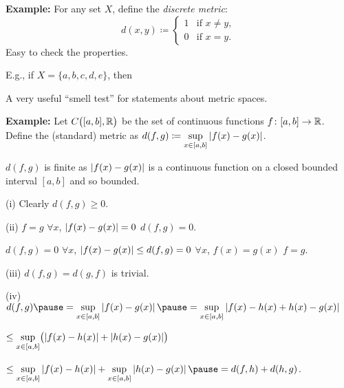 \documentclass[10pt,aspectratio=169]{beamer}
\begin{document}
\begin{frame}

\textbf{Example:}
For any set $X$, define the \emph{discrete metric}:
\begin{equation*}
d(x,y) \coloneqq
\begin{cases}
1 & \text{if } x \not= y, \\
0 & \text{if } x = y.
\end{cases}
\end{equation*}
\pause
Easy to check the properties.

\pause
\medskip

E.g., if $X = \{ a,b,c,d,e \}$, then

\begin{center}
\end{center}

\pause
A very useful 
``smell test'' for statements about metric spaces.
\end{frame}

\begin{frame}

\textbf{Example:}
Let $C\bigl([a,b],{\mathbb{R}}\bigr)$ be the set of
continuous functions $f \colon [a,b] \to {\mathbb{R}}$.
\pause
Define the (standard) metric as
\qquad $
d(f,g) \coloneqq \sup\limits_{x \in [a,b]} \left\lvert {f(x)-g(x)} \right\rvert$.

\pause
\medskip

$d(f,g)$ is finite as $\left\lvert {f(x)-g(x)} \right\rvert$ is a continuous function on a closed bounded interval
$[a,b]$ and so bounded.

\pause
\medskip

(i) \quad Clearly $d(f,g) \geq 0$. 

\pause
\medskip

(ii) \quad $f = g$
\pause
\wthus $\forall x$, $\left\lvert {f(x)-g(x)} \right\rvert = 0$
\pause
\wthus $d(f,g) = 0$.

\pause
\phantom{(ii)}\quad
$d(f,g) = 0$
\pause
\hfill\thus\hfill $\forall x$, $\left\lvert {f(x)-g(x)} \right\rvert \leq d(f,g) = 0$
\pause
\hfill\thus\hfill
$\forall x$,
$f(x) = g(x)$
\pause
\hfill\thus\hfill
$f=g$.

\pause
\medskip

(iii) \quad $d(f,g) = d(g,f)$ is trivial.

\pause
\medskip

(iv)
\quad
$
d(f,g)
\pause
=
\sup\limits_{x \in [a,b]} \abs{f(x)-g(x)}
\pause
=
\sup\limits_{x \in [a,b]} \abs{f(x)-h(x)+h(x)-g(x)}
$

\pause
\medskip

\qquad
\qquad
$
\leq
\sup\limits_{x \in [a,b]} \bigl( \left\lvert {f(x)-h(x)} \right\rvert+\left\lvert {h(x)-g(x)} \right\rvert \bigr)
$

\pause
\medskip

\qquad
\qquad
$
\leq
\sup\limits_{x \in [a,b]} \abs{f(x)-h(x)}+
\sup\limits_{x \in [a,b]} \abs{h(x)-g(x)}
\pause
= d(f,h) + d(h,g)$.

\end{frame}
\end{document}
